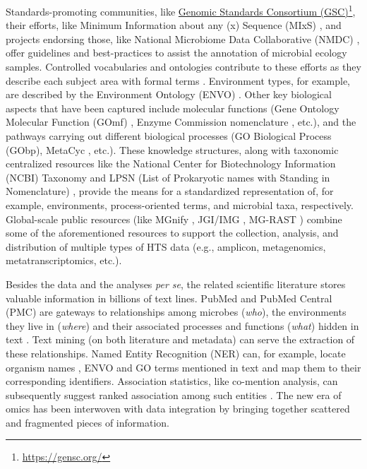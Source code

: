    Standards-promoting communities, like \href{https://gensc.org/}{Genomic Standards Consortium (GSC)}\footnote{
      \href{https://gensc.org/}{https://gensc.org/}
   }, their efforts, like Minimum Information about any (x) Sequence (MIxS) \citep{yilmaz2011minimum}, and projects endorsing those, like National Microbiome Data Collaborative (NMDC) \citep{wood2020national, vangay2021microbiome}, offer guidelines and best-practices to assist the annotation of microbial ecology samples. 
   Controlled vocabularies and ontologies contribute to these efforts as they describe each subject area with formal terms \citep{walls2014semantics}. 
   Environment types, for example, are described by the Environment Ontology (ENVO) \citep{buttigieg2016environment}. 
   Other key biological aspects that have been captured include molecular functions (Gene Ontology Molecular Function (GOmf) \citep{ashburner2000gene, gene2021gene}, Enzyme Commission nomenclature \citep{noauthor_1999}, etc.), and the pathways carrying out different biological processes (GO Biological Process (GObp), MetaCyc \citep{caspi2020metacyc}, etc.). 
   These knowledge structures, along with taxonomic centralized resources like the National Center for Biotechnology Information (NCBI) Taxonomy \citep{schoch2020ncbi}
   and LPSN (List of Prokaryotic names with Standing in Nomenclature) \citep{parte2020list}, 
   provide the means for a standardized representation of, for example, environments, process-oriented terms, and microbial taxa, respectively. Global-scale public resources (like MGnify \citep{mitchell2020mgnify}, 
   JGI/IMG \citep{chen2021img}, 
   MG-RAST \citep{wilke2015restful}) 
   combine some of the aforementioned resources to support the collection, analysis, and distribution of multiple types of HTS data (e.g., amplicon, metagenomics, metatranscriptomics, etc.).

   Besides the data and the analyses \textit{per se}, the related scientific literature stores valuable information in billions of text lines. 
   PubMed \citep{schoch2020ncbi} and PubMed Central (PMC) \citep{roberts2001pubmed} are gateways to relationships among microbes (\textit{who}), the environments they live in (\textit{where}) and their associated processes and functions (\textit{what}) hidden in text \citep{harmston2010papers}. 
   Text mining (on both literature and metadata) can serve the extraction of these relationships. Named Entity Recognition (NER) can, for example, locate organism names \citep{pafilis2013species}, ENVO and GO terms \citep{pafilis2016extract} mentioned in text and map them to their corresponding identifiers. 
   Association statistics, like co-mention analysis, can subsequently suggest ranked association among such entities \citep{von2005string, franceschini2012string}. 
   The new era of omics has been interwoven with data integration \citep{gomez2014data} by bringing together scattered and fragmented pieces of information.

